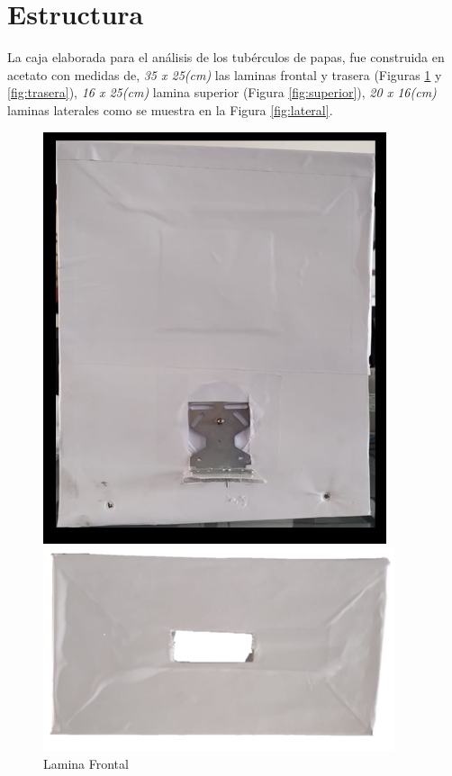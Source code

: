 \newpage	
	\section{Estructura}
		La caja elaborada para el análisis de los tubérculos de papas, fue construida en acetato con medidas de, \textit{35 x 25(cm)} las laminas frontal y trasera (Figuras \ref{fig:frontal} y \ref{fig:trasera}), \textit{16 x 25(cm)} lamina superior (Figura \ref{fig:superior}), \textit{20 x 16(cm)} laminas laterales como se muestra en la Figura \ref{fig:lateral}.
		
		\begin{figure}[ht]
			\centering
			\begin{minipage}[b]{0.25\linewidth}
				\centering
				\includegraphics[width=\linewidth]{Figs/300.png}
				\caption{Lamina Frontal}
				\label{fig:frontal}
			\end{minipage}
			\hspace{2.5cm}
			\begin{minipage}[b]{0.25\linewidth}
				\centering
				\includegraphics[width=\linewidth]{Figs/301.png}

\end{minipage}
\end{figure}

